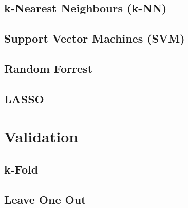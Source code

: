 \documentclass[../thesis.tex]{subfiles}
\begin{document}
\subsection{k-Nearest Neighbours (k-NN)}
\label{subsec:knn}

\subsection{Support Vector Machines (SVM)}
\label{subsec:svm}

\subsection{Random Forrest}
\label{subsec:random_forr}

\subsection{LASSO}
\label{subsec:lasso}

\section{Validation}
\label{sec:validation}

\subsection{k-Fold}
\label{subsec:k_fold}

\subsection{Leave One Out}
\label{subsec:loocv}
\end{document}
